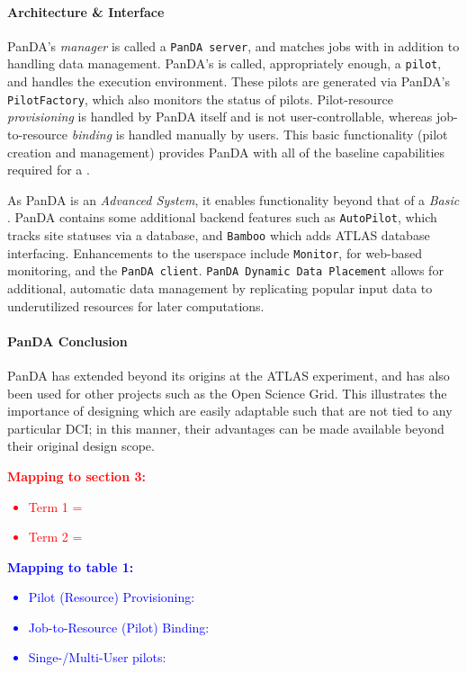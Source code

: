 \documentclass{sig-alternate}
\begin{document}
\paragraph{Architecture \& Interface}
PanDA's \textit{manager} is called a \texttt{PanDA server}, and matches
jobs with \pilots in addition to handling data management.
PanDA's \textit{\pilot}
is called, appropriately enough, a \texttt{pilot}, and handles the execution
environment.  These pilots are generated via PanDA's \texttt{PilotFactory},
which also monitors the status of pilots.
Pilot-resource \textit{provisioning} is handled by PanDA itself and is not
user-controllable, whereas job-to-resource \textit{binding} is handled
manually by users.
This basic functionality (pilot creation and management) provides
PanDA with all of the baseline capabilities required for a \pilotjob.

As PanDA is an \textit{Advanced \pilotjob System}, it enables functionality
beyond that of a \textit{Basic \pilotjob}.
PanDA contains some additional backend features such as \texttt{AutoPilot}, which
tracks site statuses via a database, and \texttt{Bamboo} which adds
ATLAS database interfacing.  Enhancements to the userspace include
\texttt{Monitor}, for web-based monitoring, and the \texttt{PanDA client}.
\texttt{PanDA Dynamic Data Placement} \cite{maeno_pd2p:_2012}
allows for additional, automatic data
management by replicating popular input data to underutilized resources
for later computations.

\paragraph{PanDA Conclusion}
PanDA has extended beyond its origins at the ATLAS experiment, and has also been used for other projects such
as the Open Science Grid.  This illustrates the importance of designing
\pilotjobs which are easily adaptable such that \pilots are not tied
to any particular DCI; in this manner, their advantages can be made
available beyond their original design scope.

\textcolor{red}
{
\textbf{Mapping to section 3:}
\begin{itemize}
\item Term 1 =
\item Term 2 =
\end{itemize}
}

\textcolor{blue}
{
\textbf{Mapping to table 1:}
\begin{itemize}
\item Pilot (Resource) Provisioning:
\item Job-to-Resource (Pilot) Binding:
\item Singe-/Multi-User pilots:
\end{itemize}
}
\end{document}

